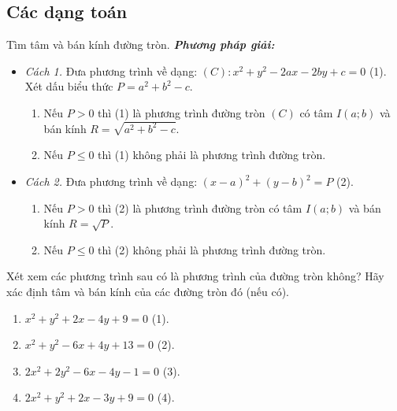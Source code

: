 \subsection{Các dạng toán}
	\begin{dang}{Tìm tâm và bán kính đường tròn.}
		\textbf{\textit{Phương pháp giải:}}
		\begin{itemize}
			\item \textit{Cách 1.} Đưa phương trình về dạng: $(C):x^2+y^2-2ax-2by+c=0 $ (1). Xét dấu biểu thức $P=a^2+b^2-c$.
			\begin{enumerate}[-]
				\item Nếu $P > 0$ thì (1) là phương trình đường tròn $(C)$ có tâm $I\left(a;b\right)$ và bán kính $R=\sqrt{a^2+b^2-c}$.
				\item Nếu $P\le 0$ thì (1) không phải là phương trình đường tròn.
			\end{enumerate}
			\item \textit{Cách 2.} Đưa phương trình về dạng: $(x-a)^2+(y-b)^2=P$ (2).
			\begin{enumerate}[-]
				\item Nếu $P > 0$ thì (2) là phương trình đường tròn có tâm $I\left(a;b\right)$ và bán kính $R=\sqrt{P}$.
				\item Nếu $P\le 0$ thì (2) không phải là phương trình đường tròn.
			\end{enumerate}
		\end{itemize}
	\end{dang}
	\begin{vd}%
		Xét xem các phương trình sau có là phương trình của đường tròn không? Hãy xác định tâm và bán kính của các đường tròn đó (nếu có).
		\begin{enumerate}
			\item $x^2+y^2+2x-4y+9=0$ (1).
			\item $x^2+y^2-6x+4y+13=0$ (2).
			\item $2x^2+2y^2-6x-4y-1=0$ (3).
			\item $2x^2+y^2+2x-3y+9=0$ (4).
		\end{enumerate}
	\end{vd}
